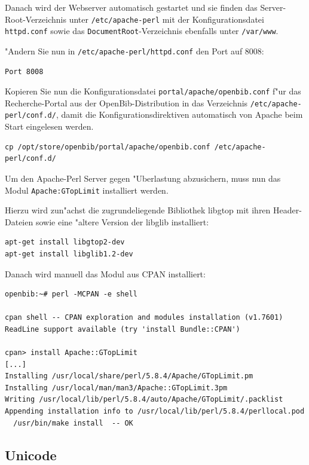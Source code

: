 \documentclass[11pt, twoside, a4paper, BCOR8mm, DIV12, bibtotoc,idxtotoc]{scrbook}
\begin{document}
Danach wird der Webserver automatisch gestartet und sie finden das
Server-Root-Verzeichnis unter \texttt{/etc/apache-perl} mit der
Konfigurationsdatei \texttt{httpd.conf} sowie das
\texttt{DocumentRoot}-Verzeichnis ebenfalls unter \texttt{/var/www}.

"Andern Sie nun in \texttt{/etc/apache-perl/httpd.conf} den Port auf
8008:

\begin{verbatim}
Port 8008
\end{verbatim}

Kopieren Sie nun die Konfigurationsdatei
\texttt{portal/apache/openbib.conf} f"ur das Recherche-Portal aus der
OpenBib-Distribution in das Verzeichnis
\texttt{/etc/apache-perl/conf.d/}, damit die Konfigurationsdirektiven
automatisch von Apache beim Start eingelesen werden.

\begin{verbatim}
cp /opt/store/openbib/portal/apache/openbib.conf /etc/apache-perl/conf.d/
\end{verbatim}

Um den Apache-Perl Server gegen "Uberlastung abzusichern, muss nun das
Modul \texttt{Apache:GTopLimit} installiert werden.

Hierzu wird zun"achst die zugrundeliegende Bibliothek libgtop mit
ihren Header-Dateien sowie eine "altere Version der libglib
installiert:

\begin{verbatim}
apt-get install libgtop2-dev
apt-get install libglib1.2-dev
\end{verbatim}

Danach wird manuell das Modul aus CPAN installiert:

\begin{verbatim}
openbib:~# perl -MCPAN -e shell

cpan shell -- CPAN exploration and modules installation (v1.7601)
ReadLine support available (try 'install Bundle::CPAN')

cpan> install Apache::GTopLimit
[...]
Installing /usr/local/share/perl/5.8.4/Apache/GTopLimit.pm
Installing /usr/local/man/man3/Apache::GTopLimit.3pm
Writing /usr/local/lib/perl/5.8.4/auto/Apache/GTopLimit/.packlist
Appending installation info to /usr/local/lib/perl/5.8.4/perllocal.pod
  /usr/bin/make install  -- OK
\end{verbatim}


\subsection{Unicode}
\end{document}
